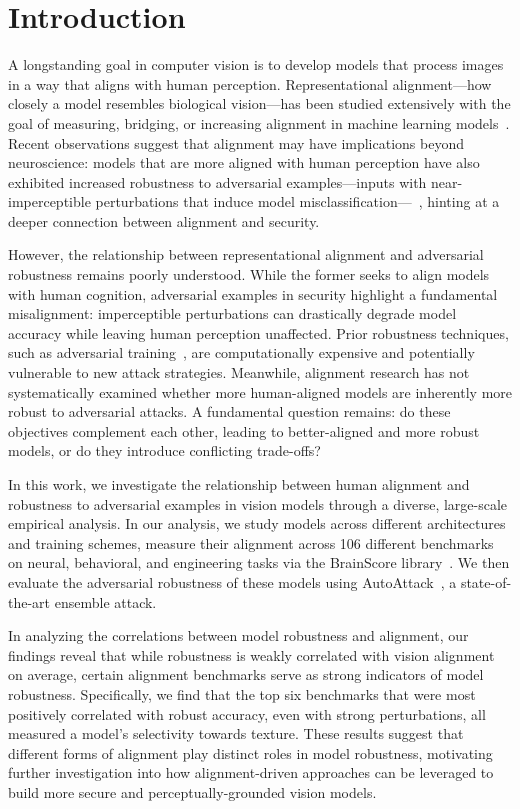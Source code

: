 \section{Introduction}\label{sec:intro}
A longstanding goal in computer vision is to develop models that process images in a way that aligns with human perception. Representational alignment---how closely a model resembles biological vision---has been studied extensively with the goal of measuring, bridging, or increasing alignment in machine learning models~\cite{sucholutsky_getting_2024}. 
Recent observations suggest that alignment may have implications beyond neuroscience: models that are more aligned with human perception have also exhibited increased robustness to adversarial examples---inputs with near-imperceptible perturbations that induce model misclassification---~\cite{dapello_simulating_2020,li_learning_2019}, hinting at a deeper connection between alignment and security.

However, the relationship between representational alignment and adversarial robustness remains poorly understood. While the former seeks to align models with human cognition, adversarial examples in security highlight a fundamental misalignment: imperceptible perturbations can drastically degrade model accuracy while leaving human perception unaffected. Prior robustness techniques, such as adversarial training~\cite{madry_towards_2019}, are computationally expensive and potentially vulnerable to new attack strategies. Meanwhile, alignment research has not systematically examined whether more human-aligned models are inherently more robust to adversarial attacks. A fundamental question remains: do these objectives complement each other, leading to better-aligned and more robust models, or do they introduce conflicting trade-offs? 


In this work, we investigate the relationship between human alignment and robustness to adversarial examples in vision models through a diverse, large-scale empirical analysis. In our analysis, we study \nummodels{} models across different architectures and training schemes, measure their alignment across 106 different benchmarks on neural, behavioral, and engineering tasks via the BrainScore library~\cite{schrimpf_brain-score_2018}. We then evaluate the adversarial robustness of these models using AutoAttack~\cite{croce_reliable_2020}, a state-of-the-art ensemble attack. 

In analyzing the correlations between model robustness and alignment, our findings reveal that while robustness is weakly correlated with vision alignment on average, certain alignment benchmarks serve as strong indicators of model robustness. Specifically, we find that the top six benchmarks that were most positively correlated with robust accuracy, even with strong perturbations, all measured a model's selectivity towards texture. These results suggest that different forms of alignment play distinct roles in model robustness, motivating further investigation into how alignment-driven approaches can be leveraged to build  more secure and perceptually-grounded vision models.

